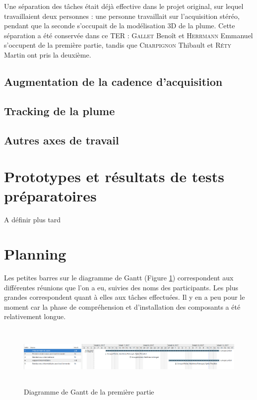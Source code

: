 \documentclass{article}
\begin{document}
	Une séparation des tâches était déjà effective dans le projet original, sur lequel travaillaient deux personnes : une personne travaillait sur l'acquisition stéréo, pendant que la seconde s'occupait de la modélisation 3D de la plume. Cette séparation a été conservée dans ce TER : \textsc{Gallet} Benoît et \textsc{Herrmann} Emmanuel s'occupent de la première partie, tandis que \textsc{Charpignon} Thibault et \textsc{Réty} Martin ont pris la deuxième.

\subsection{Augmentation de la cadence d'acquisition}



\subsection{Tracking de la plume}



\subsection{Autres axes de travail}



\section{Prototypes et résultats de tests préparatoires}
A définir plus tard

\section{Planning}

Les petites barres sur le diagramme de Gantt (Figure \ref{gantt1}) correspondent aux différentes réunions que l'on a eu, suivies des noms des participants. Les plus grandes correspondent quant à elles aux tâches effectuées. Il y en a peu pour le moment car la phase de compréhension et d'installation des composants a été relativement longue.

\begin{figure}[!h]
\centering
\includegraphics[width=\textwidth, height=3cm]{Modules/Picture/diag1.png}
\caption{Diagramme de Gantt de la première partie}
\label{gantt1}
\end{figure}

\newpage



\nocite{*}

 
 
\end{document}
